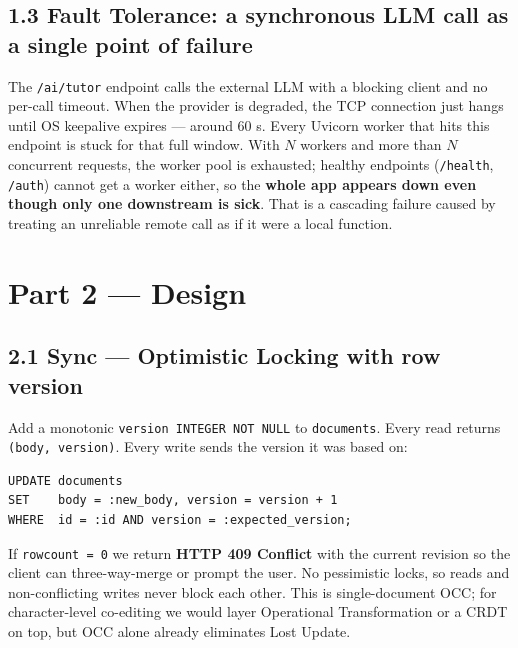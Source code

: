 \documentclass[11pt]{article}
\begin{document}
\subsection*{1.3 Fault Tolerance: a synchronous LLM call as a single point of failure}
The \texttt{/ai/tutor} endpoint calls the external LLM with a blocking client and no per-call timeout. When the
provider is degraded, the TCP connection just hangs until OS keepalive expires --- around 60 s. Every Uvicorn worker
that hits this endpoint is stuck for that full window. With $N$ workers and more than $N$ concurrent requests, the
worker pool is exhausted; healthy endpoints (\texttt{/health}, \texttt{/auth}) cannot get a worker either, so the
\textbf{whole app appears down even though only one downstream is sick}. That is a cascading failure caused by treating
an unreliable remote call as if it were a local function.

\section*{Part 2 --- Design}

\subsection*{2.1 Sync --- Optimistic Locking with row version}
Add a monotonic \texttt{version INTEGER NOT NULL} to \texttt{documents}. Every read returns \texttt{(body, version)}.
Every write sends the version it was based on:
\begin{lstlisting}[style=sql]
UPDATE documents
SET    body = :new_body, version = version + 1
WHERE  id = :id AND version = :expected_version;
\end{lstlisting}
If \texttt{rowcount = 0} we return \textbf{HTTP 409 Conflict} with the current revision so the client can three-way-merge or
prompt the user. No pessimistic locks, so reads and non-conflicting writes never block each other. This is single-document
OCC; for character-level co-editing we would layer Operational Transformation or a CRDT on top, but OCC alone already
eliminates Lost Update.
\end{document}
